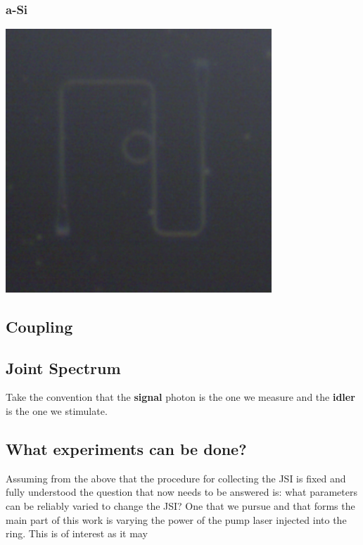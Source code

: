 \subsubsection{a-Si}
\begingroup
    \centering  
    \includegraphics[width=10cm]{img/method/chipPictures/exampleASIRing.png}
     \vspace{3pt} \label{crossCompare}
\endgroup
\subsection{Coupling}
\subsection{Joint Spectrum}
Take the convention that the {\bf signal} photon is the one we measure and the {\bf idler} is the one we stimulate.
\subsection{What experiments can be done?}
Assuming from the above that the procedure for collecting the JSI is fixed and fully understood the question that now needs to be answered is: what parameters can be reliably varied to change the JSI?
One that we pursue and that forms the main part of this work is varying the power of the pump laser injected into the ring. This is of interest as it may 
